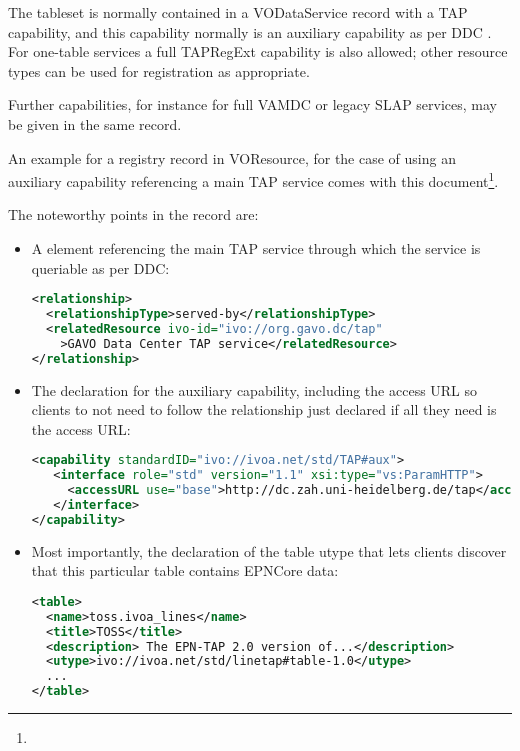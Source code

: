 \documentclass[11pt,a4paper]{ivoa}
\begin{document}
The tableset is normally contained in a VODataService 
record with a TAP capability, and this capability normally is an auxiliary
capability as per DDC \citep{2019ivoa.rept.0520D}.  For one-table
services a full TAPRegExt \citep{2012ivoa.spec.0827D} capability is also
allowed; other resource types can be used for registration as
appropriate.

Further capabilities, for instance for full VAMDC or legacy SLAP
services, may be given in the same record.

An example for a registry record in VOResource, for the case of
using an auxiliary capability referencing a main TAP service comes with
this document\footnote{}.

The noteworthy points in the record are:

\begin{itemize}
\item A  element referencing the main TAP service 
through which the service is queriable as per DDC:
\begin{lstlisting}[language=XML,basicstyle=\footnotesize]
<relationship>
  <relationshipType>served-by</relationshipType>
  <relatedResource ivo-id="ivo://org.gavo.dc/tap"
    >GAVO Data Center TAP service</relatedResource>
</relationship>
\end{lstlisting}

\item The declaration for the auxiliary capability, including the access
URL so clients to not need to follow the relationship just declared if
all they need is the access URL:
\begin{lstlisting}[language=XML,basicstyle=\footnotesize]
<capability standardID="ivo://ivoa.net/std/TAP#aux">
   <interface role="std" version="1.1" xsi:type="vs:ParamHTTP">
     <accessURL use="base">http://dc.zah.uni-heidelberg.de/tap</accessURL>
   </interface>
</capability>
\end{lstlisting}

\item Most importantly, the declaration of the table utype that lets
clients discover that this particular table contains EPNCore data:
\begin{lstlisting}[language=XML,basicstyle=\footnotesize]
<table>
  <name>toss.ivoa_lines</name>
  <title>TOSS</title>
  <description> The EPN-TAP 2.0 version of...</description>
  <utype>ivo://ivoa.net/std/linetap#table-1.0</utype>
  ...
</table>
\end{lstlisting}
\end{itemize}
\end{document}
